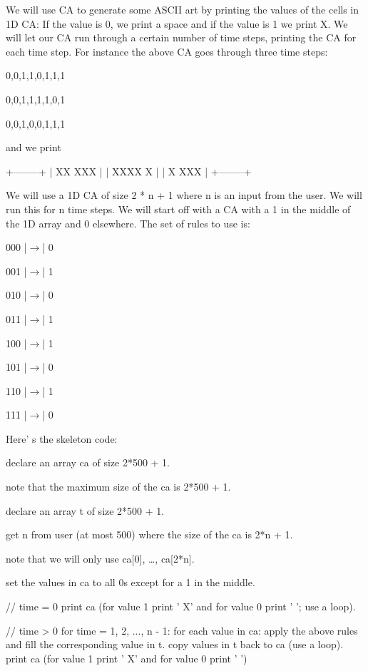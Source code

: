 We will use CA to generate some ASCII art by printing the values of the cells in 1D CA: If the value is 0, we print a space and if the value is 1 we print X. We will let our CA run through a certain number of time steps, printing the CA for each time step. For instance the above CA goes through three time steps:

\begin{console}
0,0,1,1,0,1,1,1

0,0,1,1,1,1,0,1

0,0,1,0,0,1,1,1
\end{console}

and we print

\begin{console}
+--------+
| XX XXX |
| XXXX X |
| X XXX  |
+--------+
\end{console}

We will use a 1D CA of size 2 * n + 1 where n is an input from the user. We will run this for n time steps. We will start off with a CA with a 1 in the middle of the 1D array and 0 elsewhere. The set of rules to use is:

\begin{consolethree}[escapeinside=||]
000 |$\rightarrow$| 0

001 |$\rightarrow$| 1

010 |$\rightarrow$| 0

011 |$\rightarrow$| 1

100 |$\rightarrow$| 1

101 |$\rightarrow$| 0

110 |$\rightarrow$| 1

111 |$\rightarrow$| 0
\end{consolethree}

Here' s the skeleton code:

\begin{consolethree}[escapeinside=||]
declare an array ca of size 2*500 + 1.

note that the maximum size of the ca is 2*500 + 1.

declare an array t of size 2*500 + 1.

get n from user (at most 500) where the size of the ca is 2*n + 1.

note that we will only use ca[0], \ldots, ca[2*n].

set the values in ca to all 0s except for a 1 in the middle.

// time = 0
print ca (for value 1 print ' X' and for value 0 print ' '; use a loop).

// time > 0
for time = 1, 2, ..., n - 1:
{
    for each value in ca:
    {
        apply the above rules and fill the corresponding value in t.
        copy values in t back to ca (use a loop).
        print ca (for value 1 print ' X' and for value 0 print ' ')
    }
}
\end{consolethree}

